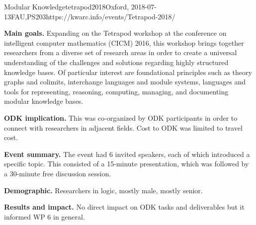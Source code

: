 \begin{event}{Modular Knowledge}{tetrapod2018}{Oxford, 2018-07-13}{FAU,PS}{20}{3}{https://kwarc.info/events/Tetrapod-2018/}

\textbf{Main goals.}
Expanding on the Tetrapod workshop at the conference on intelligent computer mathematics (CICM) 2016, this workshop brings together researchers from a diverse set of research areas in order to create a universal understanding of the challenges and solutions regarding highly structured knowledge bases.
Of particular interest are foundational principles such as theory graphs and colimits, interchange languages and module systems, languages and tools for representing, reasoning, computing, managing, and documenting modular knowledge bases.

\textbf{ODK implication.}
This was co-organized by ODK participants in order to connect with researchers in adjacent fields.
Cost to ODK was limited to travel cost.

\textbf{Event summary.}
The event had 6 invited speakers, each of which introduced a specific topic.
This consisted of a 15-minute presentation, which was followed by a 30-minute free discussion session.

\textbf{Demographic.}
Researchers in logic, mostly male, mostly senior.

\textbf{Results and impact.}
No direct impact on ODK tasks and deliverables but it informed WP 6 in general.


\end{event}